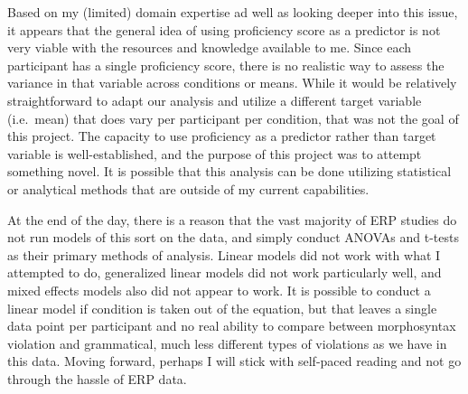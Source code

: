 \documentclass[
  man,floatsintext]{apa6}
\begin{document}
Based on my (limited) domain expertise ad well as looking deeper into this issue, it appears that the general idea of using proficiency score as a predictor is not very viable with the resources and knowledge available to me. Since each participant has a single proficiency score, there is no realistic way to assess the variance in that variable across conditions or means. While it would be relatively straightforward to adapt our analysis and utilize a different target variable (i.e.~mean) that does vary per participant per condition, that was not the goal of this project. The capacity to use proficiency as a predictor rather than target variable is well-established, and the purpose of this project was to attempt something novel. It is possible that this analysis can be done utilizing statistical or analytical methods that are outside of my current capabilities.

At the end of the day, there is a reason that the vast majority of ERP studies do not run models of this sort on the data, and simply conduct ANOVAs and t-tests as their primary methods of analysis. Linear models did not work with what I attempted to do, generalized linear models did not work particularly well, and mixed effects models also did not appear to work. It is possible to conduct a linear model if condition is taken out of the equation, but that leaves a single data point per participant and no real ability to compare between morphosyntax violation and grammatical, much less different types of violations as we have in this data. Moving forward, perhaps I will stick with self-paced reading and not go through the hassle of ERP data.
\end{document}
